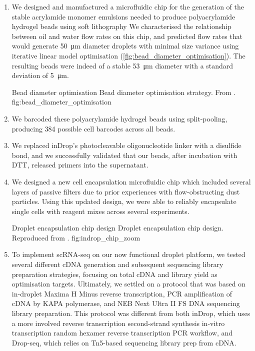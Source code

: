 \begin{enumerate}[noitemsep]
	\item We designed and manufactured a microfluidic chip for the generation of the stable acrylamide monomer emulsions needed to produce polyacrylamide hydrogel beads using soft lithography We characterised the relationship between oil and water flow rates on this chip, and predicted flow rates that would generate \SI{50}{\micro\metre} diameter droplets with minimal size variance using iterative linear model optimisation (\autoref{fig:bead_diameter_optimisation}). The resulting beads were indeed of a stable \SI{53}{\micro\metre} diameter with a standard deviation of \SI{5}{\micro\metre}.

	      {Bead diameter optimisation}
	      {Bead diameter optimisation strategy. From .}
	      {fig:bead_diameter_optimisation}

	\item We barcoded these polyacrylamide hydrogel beads using split-pooling, producing 384  possible cell barcodes across all beads.

	\item We replaced inDrop's photocleavable oligonucleotide linker with a disulfide bond, and we successfully validated that our beads, after incubation with DTT, released primers into the supernatant.

	\item We designed a new cell encapsulation microfluidic chip which included several layers of passive filters due to prior experiences with flow-obstructing dust particles. Using this updated design, we were able to reliably encapsulate single cells with reagent mixes across several experiments.

		      {\def\svgwidth{0.65\textwidth}%
			      {Droplet encapsulation chip design}
			      {Droplet encapsulation chip design. Reproduced from .}
			      {fig:indrop_chip_zoom}
		      }

	\item To implement scRNA-seq on our now functional droplet platform, we tested several different cDNA generation and subsequent sequencing library preparation strategies, focusing on total cDNA and library yield as optimisation targets. Ultimately, we settled on a protocol that was based on in-droplet Maxima H Minus reverse transcription, PCR amplification of cDNA by KAPA polymerase, and NEB Next Ultra II FS DNA sequencing library preparation. This protocol was different from both inDrop, which uses a more involved reverse transcription \textrightarrow second-strand synthesis \textrightarrow in-vitro transcription \textrightarrow random hexamer reverse transcription \textrightarrow PCR workflow, and Drop-seq, which relies on Tn5-based sequencing library prep from cDNA.
\end{enumerate}

